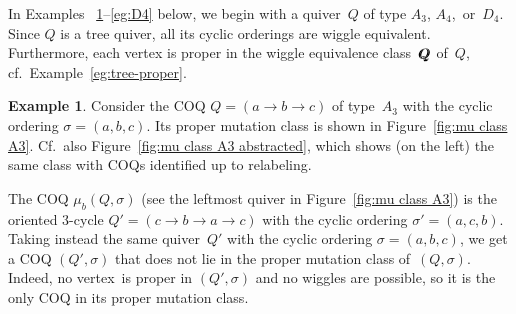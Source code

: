 \documentclass[11pt, letterpaper]{amsart}
\newcommand{\wiggleQ}{Q \hspace{-7pt} Q}%
\theoremstyle{definition}
\newtheorem{example}[theorem]{Example}
\numberwithin{equation}{section}
\begin{document}
In Examples ~\ref{eg:A3}--\ref{eg:D4} below,
we begin with a quiver~$Q$ of type $A_3$, $A_4$,~or~$D_4$. %
Since $Q$ is a tree quiver, all its cyclic orderings are wiggle equivalent. 
Furthermore, each vertex is proper in the wiggle equivalence class~$\wiggleQ$ of~$Q$, cf.\ Example~\ref{eg:tree-proper}. 


\begin{example}
\label{eg:A3}
Consider the COQ $Q=(a \rightarrow b \rightarrow c)$ of type~$A_3$ with the cyclic ordering $\sigma=(a,b,c)$. 
Its proper mutation class is shown in Figure~\ref{fig:mu class A3}. 
Cf.\ also Figure~\ref{fig:mu class A3 abstracted}, which shows (on the left) 
the same class with COQs identified up to relabeling.

The COQ $\mu_b(Q,\sigma)$ (see the leftmost quiver in Figure~\ref{fig:mu class A3}) 
is the oriented $3$-cycle $Q'=(c \rightarrow b \rightarrow a\rightarrow c)$ with the cyclic ordering $\sigma'=(a,c,b)$. 
Taking instead the same quiver~$Q'$ with the cyclic ordering $\sigma=(a,b,c)$, 
we get a COQ $(Q',\sigma)$ that does not lie in the proper mutation class of~$(Q,\sigma)$. 
Indeed, no vertex~is proper in $(Q',\sigma)$ and no wiggles are possible, so it is the only COQ in its proper mutation class.
\end{example}

\enlargethispage{15pt}
\end{document}
